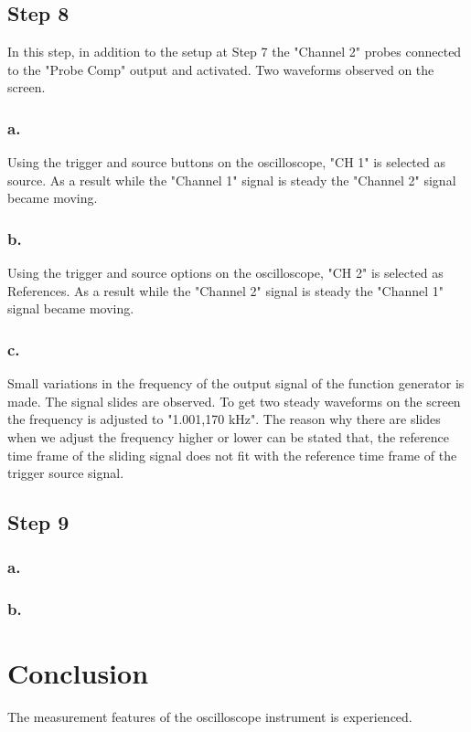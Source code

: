 \documentclass[letterpaper,12pt]{article}
\begin{document}
\subsection{Step 8}
In this step, in addition to the setup at Step 7 the "Channel 2" probes connected to the "Probe Comp" output and activated. Two waveforms observed on the screen.
\subsubsection{a.}
Using the trigger and source buttons on the oscilloscope, "CH 1" is selected as source. As a result while the "Channel 1" signal is steady the "Channel 2" signal became moving. 
\subsubsection{b.}
Using the trigger and source options on the oscilloscope, "CH 2" is selected as References. As a result while the "Channel 2" signal is steady the "Channel 1" signal became moving. 
\subsubsection{c.}
Small variations in the frequency of the output signal of the function generator is made. The signal slides are observed. To get two steady waveforms on the screen the frequency is adjusted to "1.001,170 kHz". The reason why there are slides when we adjust the frequency higher or lower can be stated that,  the reference time frame of the sliding signal does not fit with the reference time frame of the trigger source signal.

\subsection{Step 9}

\subsubsection{a.}

\subsubsection{b.}


\section{Conclusion}
The measurement features of the oscilloscope instrument is experienced.
\end{document}
